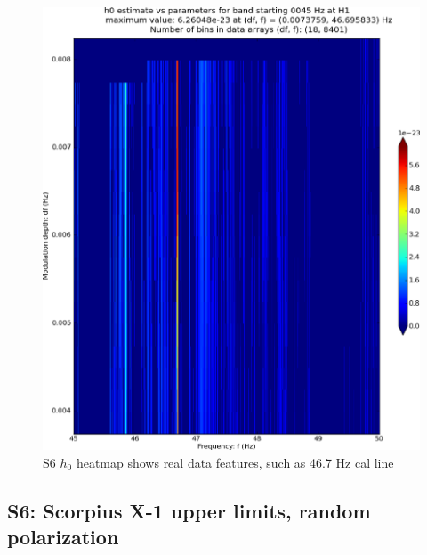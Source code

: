 \begin{figure}
\begin{center}
\includegraphics[width=0.4\paperwidth,height=0.2\paperheight]{plots/DFvsFresultsh0-H1_pulsar-0045.eps}
\caption{
S6 $h_0$ heatmap shows real data features, such as 46.7 Hz cal line}
\end{center}
\end{figure}

\subsection{S6: Scorpius X-1 upper limits, random polarization}

